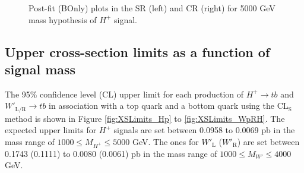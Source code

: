\begin{figure}[H]
  \centering
  \caption{Post-fit (BOnly) plots in the SR (left) and CR (right) for 5000 GeV mass hypothesis of $H^{+}$ signal.}
  \label{fig:Postfit_Hp5000_Blind}
\end{figure}


\subsection{Upper cross-section limits as a function of signal mass}
\label{subsec:Upperlimits}
The 95\% confidence level (CL) upper limit for each production of $H^{+}{\rightarrow}tb$ and $W'_{\text{L/R}}{\rightarrow}tb$ in association with a top quark and a bottom quark using the $\text{CL}_{\text{S}}$ method is shown in Figure \ref{fig:XSLimits_Hp} to \ref{fig:XSLimits_WpRH}. The expected upper limits for $H^{+}$ signals are set between 0.0958 to 0.0069 pb in the mass range of $1000 \leq M_{H^{+}} \leq 5000$ GeV. The ones for $W'_{\text{L}}$ ($W'_{\text{R}}$) are set between 0.1743 (0.1111) to 0.0080 (0.0061) pb in the mass range of $1000 \leq M_{W'} \leq 4000$ GeV.

